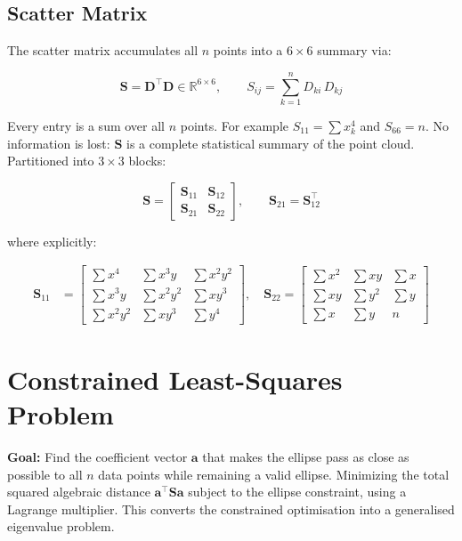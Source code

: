 \documentclass{article}
\begin{document}
	\subsection{Scatter Matrix}
	
	The scatter matrix accumulates all $n$ points
	into a $6\times6$ summary via:
	
	\begin{equation}
		\mathbf{S} = \mathbf{D}^\top \mathbf{D} \in \mathbb{R}^{6\times6},
		\qquad S_{ij} = \sum_{k=1}^{n} D_{ki}\, D_{kj}
	\end{equation}
	
	Every entry is a sum over all $n$ points.
	For example $S_{11} = \sum x_k^4$ and $S_{66} = n$.
	No information is lost: $\mathbf{S}$ is a complete
	statistical summary of the point cloud.
	Partitioned into $3\times3$ blocks:
	
	\begin{equation}
		\mathbf{S} =
		\begin{bmatrix}
			\mathbf{S}_{11} & \mathbf{S}_{12} \\
			\mathbf{S}_{21} & \mathbf{S}_{22}
		\end{bmatrix},
		\qquad
		\mathbf{S}_{21} = \mathbf{S}_{12}^\top
	\end{equation}
	
	where explicitly:
	
	\begin{align}
		\mathbf{S}_{11} &=
		\begin{bmatrix}
			\sum x^4     & \sum x^3 y   & \sum x^2 y^2 \\
			\sum x^3 y   & \sum x^2 y^2 & \sum x y^3   \\
			\sum x^2 y^2 & \sum x y^3   & \sum y^4
		\end{bmatrix}, \quad
		\mathbf{S}_{22} =
		\begin{bmatrix}
			\sum x^2 & \sum x y & \sum x \\
			\sum x y & \sum y^2 & \sum y \\
			\sum x   & \sum y   & n
		\end{bmatrix}
	\end{align}
	
	
	\section{Constrained Least-Squares Problem}

	
	\textbf{Goal:} Find the coefficient vector $\mathbf{a}$
	that makes the ellipse pass as close as possible to all
	$n$ data points while remaining a valid ellipse.
	Minimizing the total squared algebraic distance
	$\mathbf{a}^\top\mathbf{S}\mathbf{a}$ subject to the
	ellipse constraint, using a Lagrange multiplier.
	This converts the constrained optimisation into a
	generalised eigenvalue problem.
	
\end{document}
